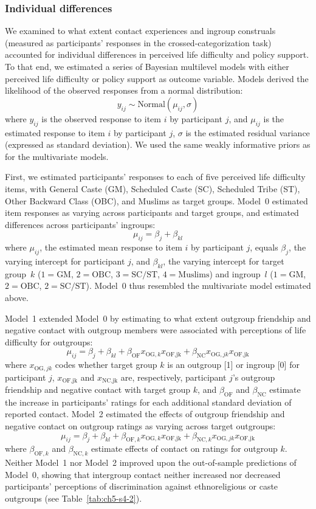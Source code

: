 \documentclass[12pt, a4paper]{article}
\begin{document}
\subsubsection{Individual differences}

We examined to what extent contact experiences and ingroup construals (measured as participants' responses in the crossed-categorization task) accounted for individual differences in perceived life difficulty and policy support. To that end, we estimated a series of Bayesian multilevel models with either perceived life difficulty or policy support as outcome variable. Models derived the likelihood of the observed responses from a normal distribution: $$ y_{ij} \sim \text{Normal} (\mu_{ij}, \sigma) $$ where $y_{ij}$ is the observed response to item $i$ by participant $j$, and $\mu_{ij}$ is the estimated response to item $i$ by participant $j$, $\sigma$ is the estimated residual variance (expressed as standard deviation). We used the same weakly informative priors as for the multivariate models.

First, we estimated participants' responses to each of five perceived life difficulty items, with General Caste (GM), Scheduled Caste (SC), Scheduled Tribe (ST), Other Backward Class (OBC), and Muslims as target groups. Model~0 estimated item responses as varying across participants and target groups, and estimated differences across participants' ingroups: $$ \mu_{ij} = \beta_{j} + \beta_{kl} $$ where $\mu_{ij}$, the estimated mean response to item $i$ by participant $j$, equals $\beta_j$, the varying intercept for participant $j$, and $\beta_{kl}$, the varying intercept for target group~$k$ ($1 = \text{GM}$, $2 = \text{OBC}$, $3 = \text{SC/ST}$, $4 = \text{Muslims}$) and ingroup~$l$ ($1 = \text{GM}$, $2 = \text{OBC}$, $2 = \text{SC/ST}$). Model~0 thus resembled the multivariate model estimated above. 

Model~1 extended Model~0 by estimating to what extent outgroup friendship and negative contact with outgroup members were associated with perceptions of life difficulty for outgroups: $$ \mu_{ij} = \beta_{j} + \beta_{kl} + \beta_\text{OF}x_{\text{OG},k}x_\text{OF,jk} + \beta_\text{NC}x_{\text{OG},jk}x_\text{OF,jk}$$ where $x_{\text{OG},jk}$ codes whether target group $k$ is an outgroup [1] or ingroup [0] for participant $j$, $x_\text{OF,jk}$ and $x_\text{NC,jk}$ are, respectively, participant $j$'s outgroup friendship and negative contact with target group $k$, and $\beta_\text{OF}$ and $\beta_\text{NC}$ estimate the increase in participants' ratings for each additional standard deviation of reported contact. Model~2 estimated the effects of outgroup friendship and negative contact on outgroup ratings as varying across target outgroups: $$ \mu_{ij} = \beta_{j} + \beta_{kl} + \beta_{\text{OF},k}x_{\text{OG},k}x_\text{OF,jk} + \beta_{\text{NC},k}x_{\text{OG},jk}x_\text{OF,jk}$$ where $\beta_{\text{OF},k}$ and $\beta_{\text{NC},k}$ estimate effects of contact on ratings for outgroup $k$. Neither Model~1 nor Model~2 improved upon the out-of-sample predictions of Model~0, showing that intergroup contact neither increased nor decreased participants' perceptions of discrimination against ethnoreligious or caste outgroups (see Table~\ref{tab:ch5-s4-2}).
\end{document}
